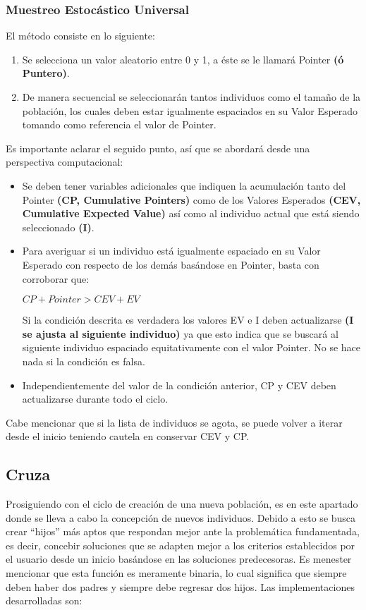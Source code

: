 \documentclass[class=report, crop=false]{standalone}
\begin{document}
\subsubsection{Muestreo Estocástico Universal}
El método consiste en lo siguiente:

\begin{enumerate}
\item Se selecciona un valor aleatorio entre 0 y 1, a éste se le 
llamará Pointer \textbf{(ó Puntero)}.
\item De manera secuencial se seleccionarán tantos individuos 
como el tamaño de la población, los cuales deben estar igualmente 
espaciados en su Valor Esperado tomando como referencia el valor 
de Pointer.
\end{enumerate}

Es importante aclarar el seguido punto, así que se abordará desde 
una perspectiva computacional:

\begin{itemize}
\item Se deben tener variables adicionales que indiquen la 
acumulación tanto del Pointer \textbf{(CP, Cumulative Pointers)} 
como de los Valores Esperados \textbf{(CEV, Cumulative Expected Value)} 
así como al individuo actual que está siendo seleccionado \textbf{(I)}.
\item Para averiguar si un individuo está igualmente espaciado en 
su Valor Esperado con respecto de los demás basándose en Pointer, 
basta con corroborar que:\medskip\break
\centerline{$CP + Pointer > CEV + EV$}\medskip\break
Si la condición descrita es verdadera los valores EV e I deben 
actualizarse \textbf{(I se ajusta al siguiente individuo)} ya 
que esto indica que se buscará al siguiente individuo espaciado 
equitativamente con el valor Pointer. No se hace nada si la 
condición es falsa.
\item Independientemente del valor de la condición anterior, CP 
y CEV deben actualizarse durante todo el ciclo.
\end{itemize}
Cabe mencionar que si la lista de individuos se agota, se puede 
volver a iterar desde el inicio teniendo cautela en conservar CEV 
y CP.

\subsection{Cruza}
\label{sec:c2_5}
Prosiguiendo con el ciclo de creación de una nueva población, 
es en este apartado donde se lleva a cabo la concepción de nuevos 
individuos.\break
Debido a esto se busca crear ``hijos'' más aptos que respondan 
mejor ante la problemática fundamentada, es decir, concebir 
soluciones que se adapten mejor a los criterios establecidos 
por el usuario desde un inicio basándose en las soluciones 
predecesoras.\break
Es menester mencionar que esta función es meramente binaria, 
lo cual significa que siempre deben haber dos padres y siempre 
debe regresar dos hijos.\medskip\break
Las implementaciones desarrolladas son:
\end{document}
